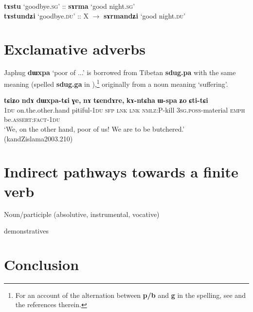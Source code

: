\documentclass[11pt]{article}
\newcommand{\ipa}[1]{{\phon\textbf{#1}}}
\begin{document}
\begin{exe}
\ex \label{ex:analogy.sArma}
\gll
\ipa{tɤstu} `goodbye.\textsc{sg}' :: {\ipa{sɤrma} `good night.\textsc{sg}'} \\
\ipa{tɤstundʑi} `goodbye.\textsc{du}' :: {X $\rightarrow$ \ipa{sɤrmandʑi} `good night.\textsc{du}'} \\
\end{exe}

\section{Exclamative adverbs}
Japhug \ipa{dɯxpa} `poor of ...' is borrowed from Tibetan \ipa{sdug.pa} with the same meaning (spelled \ipa{sdug.ga} in \citealt{bodrgya}),\footnote{For an account of the alternation between \ipa{p/b} and \ipa{g} in the spelling, see \citet{hill11hb} and the references therein.} originally from a noun meaning `suffering'.

\begin{exe}
\ex 
\gll
\ipa{tɕiʑo} 	\ipa{ndɤ} 	\ipa{dɯxpa-tɕi} 	\ipa{ɣe,} 	\ipa{nɤ} 	\ipa{tɕendɤre,} 	\ipa{kɤ-ntɕha} 	\ipa{ɯ-spa} 	\ipa{ʑo} 	\ipa{ɕti-tɕi}  \\
\textsc{1du} on.the.other.hand pitiful-\textsc{1du} \textsc{sfp} \textsc{lnk} \textsc{lnk} \textsc{nmlz}:P-kill \textsc{3sg.poss}-material \textsc{emph} be.\textsc{assert:fact-1du} \\
\glt `We, on the other hand, poor of us! We are to be butchered.' (kandZislama2003.210)
\end{exe}

\section{Indirect pathways towards a finite verb}

Noun/participle (absolutive, instrumental, vocative)

demonstratives

\section*{Conclusion}




 
\end{document}
